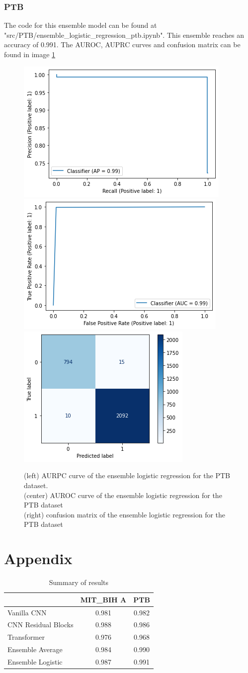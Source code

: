 \documentclass[11pt]{scrartcl}
\begin{document}
\subsubsection{PTB}
The code for this ensemble model can be found at "src/PTB/ensemble\_logistic\_regression\_ptb.ipynb".
This ensemble reaches an accuracy of 0.991. The AUROC, AUPRC curves and confusion matrix can be found in image \ref{fig:ensemble_logistic_ptb_three}
\begin{figure}[htp]
\centering
\includegraphics[width=.30\textwidth]{../models_performance_graphs/ptb/ensemble_logistic_AURPC_ptb.png}\hfill
\includegraphics[width=.30\textwidth]{../models_performance_graphs/ptb/ensemble_logistic_AUROC_ptb.png}\hfill
\includegraphics[width=.30\textwidth]{../models_performance_graphs/ptb/ensemble_logistic_confusion_ptb.png}
\caption{(left) AURPC curve of the ensemble logistic regression for the PTB dataset. \\ (center) AUROC curve of the ensemble logistic regression for the PTB dataset \\ (right) confusion matrix of the ensemble logistic regression for the PTB dataset}
\label{fig:ensemble_logistic_ptb_three}
\end{figure}

\newpage
\section{Appendix}

\begin{table}[ht]
\centering
\caption{Summary of results}
\begin{tabular}[t]{lcc}
\toprule
&MIT\_BIH A&PTB\\
\midrule
Vanilla CNN &0.981&0.982\\
CNN Residual Blocks&0.988&0.986\\
Transformer&0.976&0.968\\
Ensemble Average&0.984&0.990\\
Ensemble Logistic&0.987&0.991\\
\bottomrule
\end{tabular}
\end{table}
\end{document}
